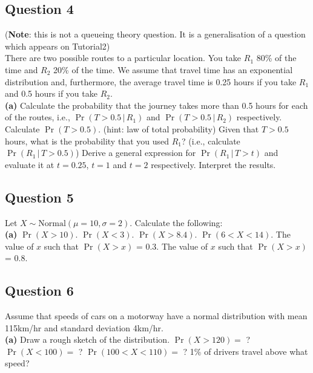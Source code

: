 \documentclass[]{article}
\begin{document}
\subsection*{Question 4}
{\footnotesize({\bf Note}: this is not a queueing theory question. It is a generalisation of a question which appears on Tutorial2)}\\[0.1cm]
There are two possible routes to a particular location. You take $R_1$ 80\% of the time and $R_2$ 20\% of the time. We assume that travel time has an exponential distribution and, furthermore, the average travel time is 0.25 hours if you take $R_1$ and 0.5 hours if you take $R_2$.\\[-0.2cm]

{\bf(a)} Calculate the probability that the journey takes more than 0.5 hours for each of the routes, i.e., $\Pr(T > 0.5\,|\,R_1)$ and $\Pr(T > 0.5\,|\,R_2)$ respectively.  Calculate $\Pr(T > 0.5)$. (hint: law of total probability)  Given that $T>0.5$ hours, what is the probability that you used $R_1$? (i.e., calculate $\Pr(R_1\,|\,T>0.5)$)  Derive a general expression for $\Pr(R_1\,|\,T>t)$ and evaluate it at $t=0.25$, $t = 1$ and $t = 2$ respectively. Interpret the results.




\subsection*{Question 5}
Let $X \sim \text{Normal}(\mu=10,\sigma=2)$. Calculate the following:\\[-0.2cm]

{\bf(a)} $\Pr(X>10)$.  $\Pr(X<3)$.  $\Pr(X>8.4)$.  $\Pr(6<X<14)$.  The value of $x$ such that $\Pr(X>x)$ = 0.3.  The value of $x$ such that $\Pr(X>x)$ = 0.8.



\subsection*{Question 6}
Assume that speeds of cars on a motorway have a normal distribution with mean 115km/hr and standard deviation 4km/hr.\\[-0.2cm]

{\bf(a)} Draw a rough sketch of the distribution.  $\Pr(X>120)=$ ?  $\Pr(X<100)=$ ?  $\Pr(100<X<110)=$ ?  1\% of drivers travel above what speed?
\end{document}
